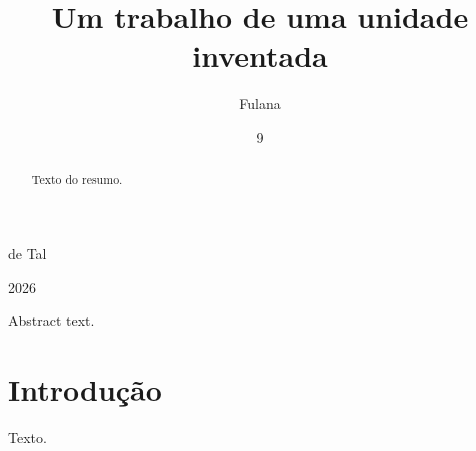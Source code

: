 \documentclass[dsc]{ufrj}
\begin{document}
\title{Um trabalho de uma unidade inventada}
\author{Fulana}{de Tal}
\date{9}{2026}
\maketitle
\frontmatter
\begin{abstract}
Texto do resumo.
\end{abstract}
\begin{foreignabstract}
Abstract text.
\end{foreignabstract}
\mainmatter
\chapter{Introdução}
Texto.
\ufrjfinalpage
\end{document}
